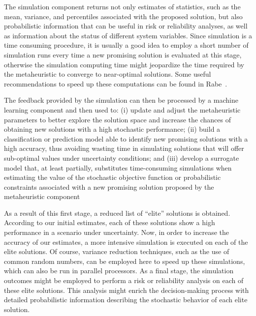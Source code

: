The simulation component returns not only estimates of statistics, such as the
mean, variance, and percentiles associated with the proposed solution, but also
probabilistic information that can be useful in risk or reliability analyses, as
well as information about the status of different system variables. Since
simulation is a time consuming procedure, it is usually a good idea to employ a
short number of simulation runs every time a new promising solution is evaluated
at this stage, otherwise the simulation computing time might jeopardize the time
required by the metaheuristic to converge to near-optimal solutions.  Some
useful recommendations to speed up these computations can be found in
Rabe~\cite{rabe:2020}. 

The feedback provided by the simulation can then be processed by a machine
learning component and then used to: (i) update and adjust the metaheuristic
parameters to better explore the solution space and increase the chances of
obtaining new solutions with a high stochastic performance; (ii) build a
classification or prediction model able to identify new promising solutions with
a high accuracy, thus avoiding wasting time in simulating solutions that will
offer sub-optimal values under uncertainty conditions; and (iii) develop a
surrogate model that, at least partially, substitutes time-consuming simulations
when estimating the value of the stochastic objective function or probabilistic
constraints associated with a new promising solution proposed by the
metaheuristic component

As a result of this first stage, a reduced list of ``elite'' solutions is
obtained. According to our initial estimates, each of these solutions show a
high performance in a scenario under uncertainty. Now, in order to increase the
accuracy of our estimates, a more intensive simulation is executed on each of
the elite solutions. Of course, variance reduction techniques, such as the use
of common random numbers, can be employed here to speed up these simulations,
which can also be run in parallel processors. As a final stage, the simulation
outcomes might be employed to perform a risk or reliability analysis on each of
these elite solutions. This analysis might enrich the decision-making process
with detailed probabilistic information describing the stochastic behavior of
each elite solution.

